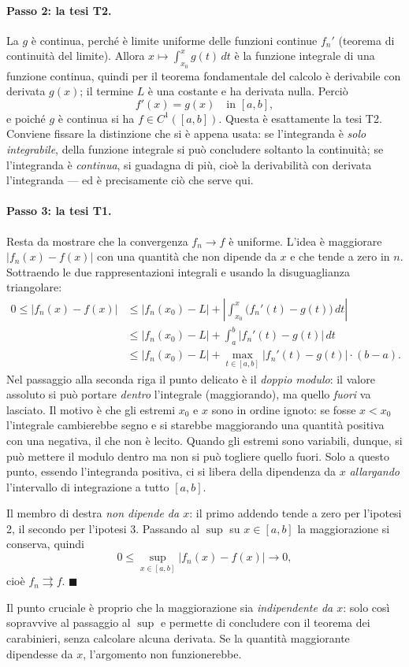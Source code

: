 \paragraph{Passo 2: la tesi T2.} La $g$ è continua, perché è limite uniforme delle
funzioni continue $f_n'$ (teorema di continuità del limite). Allora
$x\mapsto\int_{x_0}^{x} g(t)\,dt$ è la funzione integrale di una funzione continua,
quindi per il teorema fondamentale del calcolo è derivabile con derivata $g(x)$; il
termine $L$ è una costante e ha derivata nulla. Perciò
\[
f'(x)=g(x)\quad\text{in }[a,b],
\]
e poiché $g$ è continua si ha $f\in C^1([a,b])$. Questa è esattamente la tesi T2.
Conviene fissare la distinzione che si è appena usata: se l'integranda è \emph{solo
integrabile}, della funzione integrale si può concludere soltanto la continuità; se
l'integranda è \emph{continua}, si guadagna di più, cioè la derivabilità con derivata
l'integranda — ed è precisamente ciò che serve qui.

\paragraph{Passo 3: la tesi T1.} Resta da mostrare che la convergenza $f_n\to f$ è
uniforme. L'idea è maggiorare $|f_n(x)-f(x)|$ con una quantità che non dipende da $x$ e
che tende a zero in $n$. Sottraendo le due rappresentazioni integrali e usando la
disuguaglianza triangolare:
\begin{align*}
0\le |f_n(x)-f(x)|
&\le |f_n(x_0)-L|+\left|\int_{x_0}^{x}\big(f_n'(t)-g(t)\big)\,dt\right|\\
&\le |f_n(x_0)-L|+\int_a^b \big|f_n'(t)-g(t)\big|\,dt\\
&\le |f_n(x_0)-L|+\max_{t\in[a,b]}\big|f_n'(t)-g(t)\big|\cdot(b-a).
\end{align*}
Nel passaggio alla seconda riga il punto delicato è il \emph{doppio modulo}: il valore
assoluto si può portare \emph{dentro} l'integrale (maggiorando), ma quello \emph{fuori} va
lasciato. Il motivo è che gli estremi $x_0$ e $x$ sono in ordine ignoto: se fosse $x<x_0$
l'integrale cambierebbe segno e si starebbe maggiorando una quantità positiva con una
negativa, il che non è lecito. Quando gli estremi sono variabili, dunque, si può mettere
il modulo dentro ma non si può togliere quello fuori.
Solo a questo punto, essendo l'integranda positiva, ci si libera della dipendenza da $x$
\emph{allargando} l'intervallo di integrazione a tutto $[a,b]$.

Il membro di destra \emph{non dipende da $x$}: il primo addendo tende a zero per
l'ipotesi 2, il secondo per l'ipotesi 3. Passando al $\sup$ su $x\in[a,b]$ la
maggiorazione si conserva, quindi
\[
0\le\sup_{x\in[a,b]}|f_n(x)-f(x)|\longrightarrow 0,
\]
cioè $f_n\rightrightarrows f$. $\blacksquare$

Il punto cruciale è proprio che la maggiorazione sia \emph{indipendente da $x$}: solo così
sopravvive al passaggio al $\sup$ e permette di concludere con il teorema dei carabinieri,
senza calcolare alcuna derivata. Se la quantità maggiorante dipendesse da $x$, l'argomento
non funzionerebbe.
